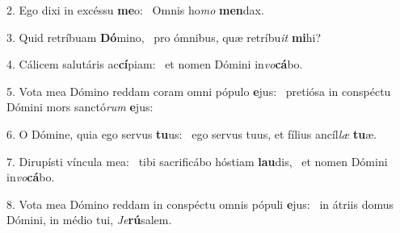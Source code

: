 2. Ego dixi in excéssu \textbf{me}o: \ast\  Omnis ho\textit{mo} \textbf{men}dax.\

3. Quid retríbuam \textbf{Dó}mino, \ast\  pro ómnibus, quæ retríbu\textit{it} \textbf{mi}hi?\

4. Cálicem salutáris ac\textbf{cí}piam: \ast\  et nomen Dómini in\textit{vo}\textbf{cá}bo.\

5. Vota mea Dómino reddam coram omni pópulo \textbf{e}jus: \ast\  pretiósa in conspéctu Dómini mors sanctó\textit{rum} \textbf{e}jus:\

6. O Dómine, quia ego servus \textbf{tu}us: \ast\  ego servus tuus, et fílius ancíl\textit{læ} \textbf{tu}æ.\

7. Dirupísti víncula mea: \dag\  tibi sacrificábo hóstiam \textbf{lau}dis, \ast\  et nomen Dómini in\textit{vo}\textbf{cá}bo.\

8. Vota mea Dómino reddam in conspéctu omnis pópuli \textbf{e}jus: \ast\  in átriis domus Dómini, in médio tui, \textit{Je}\textbf{rú}salem.\

